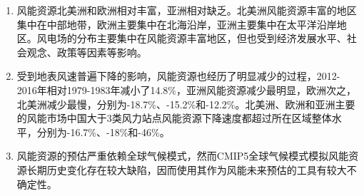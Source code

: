 \begin{enumerate}

\item 风能资源北美洲和欧洲相对丰富，亚洲相对缺乏。北美洲风能资源丰富的地区集中在中部地带，欧洲主要集中在北海沿岸，亚洲主要集中在太平洋沿岸地区。风电场的分布主要集中在风能资源丰富地区，但也受到经济发展水平、社会观念、政策等因素等影响。

\item 受到地表风速普遍下降的影响，风能资源也经历了明显减少的过程，2012-2016年相对1979-1983年减小了14.8\%，亚洲风能资源减少最明显，欧洲次之，北美洲减少最慢，分别为-18.7\%、-15.2\%和-12.2\%。北美洲、欧洲和亚洲主要的风能市场中国大于3类风力站点风能资源下降速度都超过所在区域整体水平，分别为-16.7\%、-18\%和-46\%。

\item 风能资源的预估严重依赖全球气候模式，然而CMIP5全球气候模式模拟风能资源长期历史变化存在较大缺陷，因而使用其作为风能未来预估的工具有较大不确定性。

\end{enumerate}

